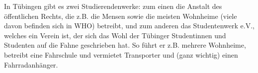 
In Tübingen gibt es zwei Studierendenwerke: zum einen die Anstalt des
  öffentlichen Rechts, die z.B. die Mensen sowie die meisten
  Wohnheime (viele davon befinden sich in WHO) betreibt, und zum
  anderen das Studentenwerk e.V., welches ein Verein ist, der sich das Wohl
  der Tübinger Studentinnen und Studenten auf die Fahne geschrieben
  hat.  So führt er z.B. mehrere Wohnheime, betreibt eine Fahrschule
  und vermietet Transporter und (ganz wichtig) einen Fahrradanhänger.
